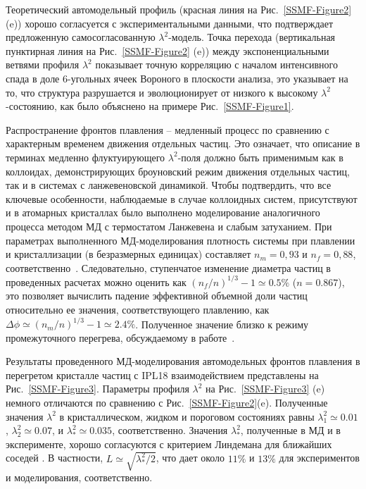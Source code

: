 Теоретический автомодельный профиль (красная линия на Рис.~\ref{SSMF-Figure2} (e)) хорошо согласуется с экспериментальными данными, что подтверждает предложенную самосогласованную $\lambda^2$-модель.
Точка перехода (вертикальная пунктирная линия на Рис.~\ref{SSMF-Figure2} (e)) между экспоненциальными ветвями профиля $ \lambda^2$ показывает точную корреляцию с началом интенсивного спада в доле 6-угольных ячеек Вороного в плоскости анализа, это указывает на то, что структура разрушается и эволюционирует от низкого к высокому $\lambda^2$-состоянию, как было объяснено на примере Рис.~\ref{SSMF-Figure1}.


Распространение фронтов плавления -- медленный процесс по сравнению с характерным временем движения отдельных частиц.
Это означает, что описание в терминах медленно флуктуирующего $\lambda^2$-поля должно быть применимым как в коллоидах, демонстрирующих броуновский режим движения отдельных частиц, так и в системах с ланжевеновской динамикой.
Чтобы подтвердить, что все ключевые особенности, наблюдаемые в случае коллоидных систем, присутствуют и в атомарных кристаллах было выполнено моделирование аналогичного процесса методом МД с термостатом Ланжевена и слабым затуханием.
При параметрах выполненного МД-моделирования плотность системы при плавлении и кристаллизации (в безразмерных единицах) составляет $ n_m = 0,93 $ и $ n_f = 0,88 $, соответственно~\cite{10.1080/00268979500100911}.
Следовательно, ступенчатое изменение диаметра частиц в проведенных расчетах можно оценить как $ (n_f / n) ^ {1/3} -1 \simeq 0.5 \% $ ($ n = 0.867 $), это позволяет вычислить падение эффективной объемной доли частиц относительно ее значения, соответствующего плавлению, как
$\Delta \phi  \simeq (n_m/n)^{1/3}-1\simeq 2.4\%$.
Полученное значение близко к режиму промежуточного перегрева, обсуждаемому в работе~\cite{10.1038/ncomms7942}.

Результаты проведенного МД-моделирования автомодельных фронтов плавления в перегретом кристалле частиц с IPL18 взаимодействием представлены на Рис.~\ref{SSMF-Figure3}.
Параметры профиля $\lambda^2$ на Рис.~\ref{SSMF-Figure3} (e) немного отличаются по сравнению с Рис.~\ref{SSMF-Figure2}(e).
Полученные значения $\lambda^2$ в кристаллическом, жидком и пороговом состояниях равны $\lambda_1^2 \simeq 0.01$, $\lambda_2^2 \simeq 0.07$, и $\lambda_\ast^2 \simeq 0.035$, соответственно.
Значения $\lambda_\ast^2$, полученные в МД и в эксперименте, хорошо согласуются с критерием Линдемана для ближайших соседей \cite{10.1016/0375-9601(85)90617-6}.
В частности, $L\simeq \sqrt{\lambda_\ast ^ 2/2} $, что дает около $ 11 \% $ и $ 13 \% $ для экспериментов и моделирования, соответственно.

